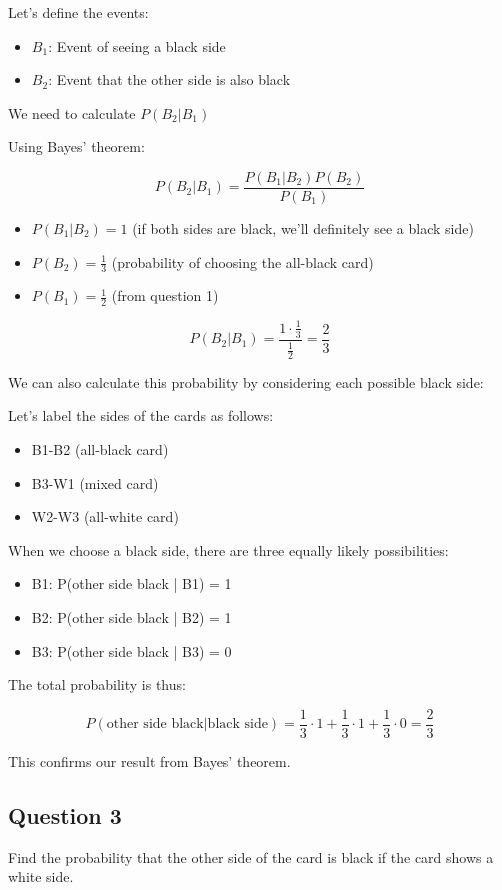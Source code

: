 \documentclass[addpoints]{exam}
\begin{document}
Let's define the events:

\begin{itemize}
    \item $B_1$: Event of seeing a black side
    \item $B_2$: Event that the other side is also black
\end{itemize}

We need to calculate $P(B_2|B_1)$

Using Bayes' theorem:

\[P(B_2|B_1) = \frac{P(B_1|B_2)P(B_2)}{P(B_1)}\]

\begin{itemize}
    \item $P(B_1|B_2) = 1$ (if both sides are black, we'll definitely see a black side)
    \item $P(B_2) = \frac{1}{3}$ (probability of choosing the all-black card)
    \item $P(B_1) = \frac{1}{2}$ (from question 1)
\end{itemize}
 \[P(B_2|B_1) = \frac{1 \cdot \frac{1}{3}}{\frac{1}{2}} = \boxed{ \frac{2}{3} }\]

We can also calculate this probability by considering each possible black side:

Let's label the sides of the cards as follows:
\begin{itemize}
    \item B1-B2 (all-black card)
    \item B3-W1 (mixed card)
    \item W2-W3 (all-white card)
\end{itemize}

When we choose a black side, there are three equally likely possibilities:
\begin{itemize}
    \item B1: P(other side black | B1) = 1
    \item B2: P(other side black | B2) = 1
    \item B3: P(other side black | B3) = 0
\end{itemize}

The total probability is thus:

\[ P(\text{other side black} | \text{black side}) = \frac{1}{3} \cdot 1 + \frac{1}{3} \cdot 1 + \frac{1}{3} \cdot 0 = \frac{2}{3} \]

This confirms our result from Bayes' theorem.



\subsection{Question 3}
Find the probability that the other side of the card is black if the card shows a white side.
\end{document}
